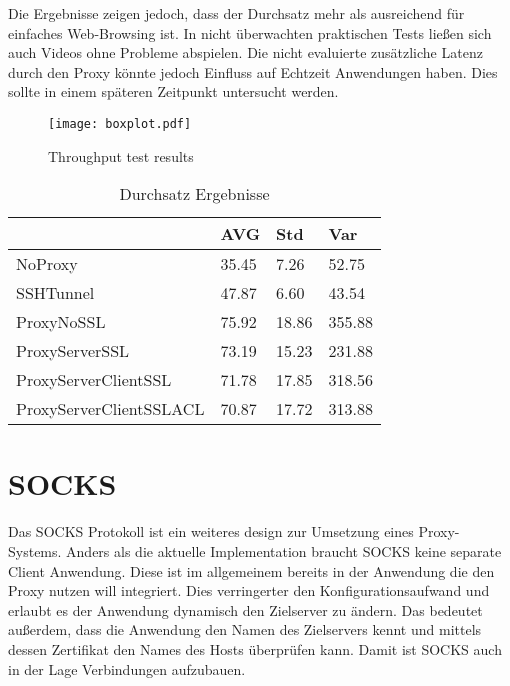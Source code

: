 \documentclass[12pt, a4paper]{scrartcl}
\begin{document}
Die Ergebnisse zeigen jedoch, dass der Durchsatz mehr als ausreichend für einfaches Web-Browsing ist. In nicht überwachten praktischen Tests ließen sich auch Videos ohne Probleme abspielen. Die nicht evaluierte zusätzliche Latenz durch den Proxy könnte jedoch Einfluss auf Echtzeit Anwendungen haben. Dies sollte in einem späteren Zeitpunkt untersucht werden.
\begin{figure}[]
    \centering
    \texttt{[image: boxplot.pdf]}
    \caption{Throughput test results}\label{fig::boxres}
\end{figure}
\begin{table}[]
    \centering
    \begin{tabular}{|l|l|l|l|}
    \hline
                            & AVG   & Std   & Var    \\ \hline
    NoProxy                 & 35.45 & 7.26  & 52.75  \\ \hline
    SSHTunnel               & 47.87 & 6.60  & 43.54  \\ \hline
    ProxyNoSSL              & 75.92 & 18.86 & 355.88 \\ \hline
    ProxyServerSSL          & 73.19 & 15.23 & 231.88 \\ \hline
    ProxyServerClientSSL    & 71.78 & 17.85 & 318.56 \\ \hline
    ProxyServerClientSSLACL & 70.87 & 17.72 & 313.88 \\ \hline
    \end{tabular}
    \caption{ Durchsatz Ergebnisse}\label{tab::vals}
    \end{table}

\section{SOCKS}
Das SOCKS Protokoll ist ein weiteres design zur Umsetzung eines Proxy-Systems. Anders als die aktuelle Implementation braucht SOCKS keine separate Client Anwendung. Diese ist im allgemeinem bereits in der Anwendung die den Proxy nutzen will integriert. Dies verringerter den Konfigurationsaufwand und erlaubt es der Anwendung dynamisch den Zielserver zu ändern. Das bedeutet außerdem, dass die Anwendung den Namen des Zielservers kennt und mittels dessen Zertifikat den Names des Hosts überprüfen kann. Damit ist SOCKS auch in der Lage  Verbindungen aufzubauen.
\end{document}

